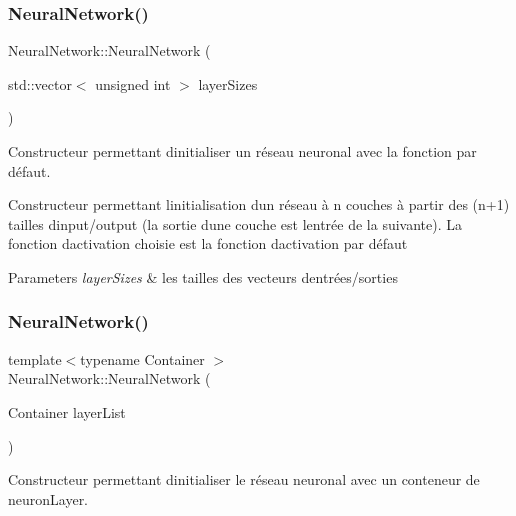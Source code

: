 \subsubsection{\texorpdfstring{Neural\+Network()}{NeuralNetwork()}\hspace{0.1cm}{\footnotesize\ttfamily [2/3]}}
{\footnotesize\ttfamily Neural\+Network\+::\+Neural\+Network (\begin{DoxyParamCaption}\item[{std\+::vector$<$ unsigned int $>$}]{layer\+Sizes }\end{DoxyParamCaption})}



Constructeur permettant d\textquotesingle{}initialiser un réseau neuronal avec la fonction par défaut. 

Constructeur permettant l\textquotesingle{}initialisation d\textquotesingle{}un réseau à n couches à partir des (n+1) tailles d\textquotesingle{}input/output (la sortie d\textquotesingle{}une couche est l\textquotesingle{}entrée de la suivante). La fonction d\textquotesingle{}activation choisie est la fonction d\textquotesingle{}activation par défaut 
\begin{DoxyParams}{Parameters}
{\em layer\+Sizes} & les tailles des vecteurs d\textquotesingle{}entrées/sorties \\
\hline
\end{DoxyParams}
\mbox{\label{classNeuralNetwork_a7943bb4e9cb96aae048b236d4f1dd979}} 
\subsubsection{\texorpdfstring{Neural\+Network()}{NeuralNetwork()}\hspace{0.1cm}{\footnotesize\ttfamily [3/3]}}
{\footnotesize\ttfamily template$<$typename Container $>$ \\
Neural\+Network\+::\+Neural\+Network (\begin{DoxyParamCaption}\item[{Container}]{layer\+List }\end{DoxyParamCaption})}



Constructeur permettant d\textquotesingle{}initialiser le réseau neuronal avec un conteneur de neuron\+Layer. 


